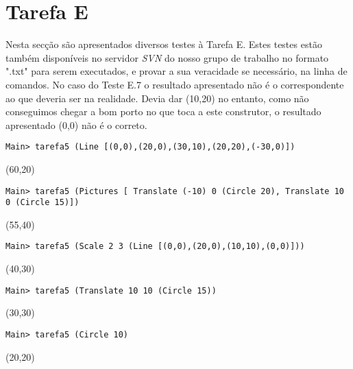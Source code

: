 \documentclass[a4paper,12pt]{report}
\begin{document}
\section{Tarefa E}

Nesta secção são apresentados diversos testes à Tarefa E. Estes testes estão também disponíveis no servidor {\sl SVN} do nosso grupo de trabalho no formato ".txt" para serem executados, e provar a sua veracidade se necessário, na linha de comandos. No caso do Teste E.7 o resultado apresentado não é o correspondente ao que deveria ser na realidade. Devia dar (10,20) no entanto, como não conseguimos chegar a bom porto no que toca a este construtor, o resultado apresentado (0,0) não é o correto.
\\
\begin{tcolorbox}[width=\textwidth,colback={black},title={\sf Teste E.1:},outer arc=0mm,colupper=white]    
	{\footnotesize\tt *Main> tarefa5 (Line [(0,0),(20,0),(30,10),(20,20),(-30,0)])
		
		(60,20) }
\end{tcolorbox}

\begin{tcolorbox}[width=\textwidth,colback={black},title={\sf Teste E.2:},outer arc=0mm,colupper=white]    
	{\footnotesize\tt *Main> tarefa5 (Pictures [ Translate (-10) 0 (Circle 20), Translate 10 0 (Circle 15)])
		
		(55,40) }
\end{tcolorbox}

\begin{tcolorbox}[width=\textwidth,colback={black},title={\sf Teste E.3:},outer arc=0mm,colupper=white]    
	{\footnotesize\tt *Main> tarefa5 (Scale 2 3 (Line [(0,0),(20,0),(10,10),(0,0)]))
		
		(40,30) }
\end{tcolorbox}


\begin{tcolorbox}[width=\textwidth,colback={black},title={\sf Teste E.4:},outer arc=0mm,colupper=white]    
	{\footnotesize\tt *Main> tarefa5 (Translate 10 10 (Circle 15))
		
		(30,30) }
\end{tcolorbox}

\begin{tcolorbox}[width=\textwidth,colback={black},title={\sf Teste E.5:},outer arc=0mm,colupper=white]    
	{\footnotesize\tt *Main> tarefa5 (Circle 10)
		
		(20,20) }
\end{tcolorbox}
\end{document}
